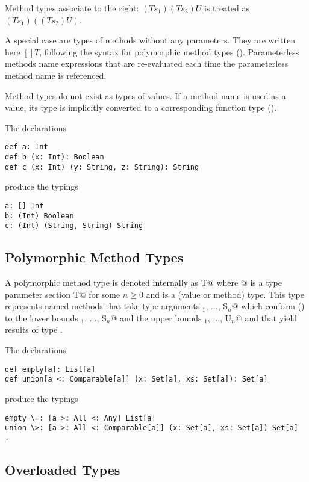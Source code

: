 \documentclass[11pt]{report}
\begin{document}
Method types associate to the right: $(Ts_1)(Ts_2)U$ is treated as
$(Ts_1)((Ts_2)U)$.

A special case are types of methods without any parameters. They are
written here $[]T$, following the syntax for polymorphic method types
(). Parameterless methods name expressions that
are re-evaluated each time the parameterless method name is
referenced.

Method types do not exist as types of values. If a method name is used
as a value, its type is implicitly converted to a corresponding
function type ().

\example The declarations
\begin{verbatim}
def a: Int
def b (x: Int): Boolean
def c (x: Int) (y: String, z: String): String
\end{verbatim}
produce the typings
\begin{verbatim}
a: [] Int
b: (Int) Boolean
c: (Int) (String, String) String
\end{verbatim}

\subsection{Polymorphic Method Types}
\label{sec:poly-types}

A polymorphic method type is denoted internally as \verb@[tps]T@ where
\verb@[tps]@ is a type parameter section 
\verb@[a$_1$ <: L$_1$ >: U$_1$, ..., a$_n$ <: L$_n$ >: U$_n$] T@ 
for some $n \geq 0$ and \verb@T@ is a
(value or method) type.  This type represents named methods that
take type arguments \verb@S$_1$, ..., S$_n$@ which
conform () to the lower bounds
\verb@S$_1$, ..., S$_n$@ and the upper bounds
\verb@U$_1$, ..., U$_n$@ and that yield results of type \verb@T@.

\example The declarations
\begin{verbatim}
def empty[a]: List[a]
def union[a <: Comparable[a]] (x: Set[a], xs: Set[a]): Set[a]
\end{verbatim}
produce the typings
\begin{verbatim}
empty \=: [a >: All <: Any] List[a]
union \>: [a >: All <: Comparable[a]] (x: Set[a], xs: Set[a]) Set[a]  .
\end{verbatim}

\subsection{Overloaded Types}
\label{sec:overloaded-types}
\newcommand{\overload}{\la\mbox{\sf and}\ra}
\end{document}

